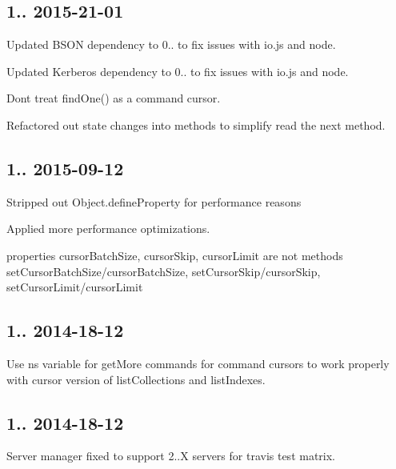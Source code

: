 \subsection*{1.. 2015-\/21-\/01 }


\begin{DoxyItemize}
\item Updated B\+S\+ON dependency to 0.. to fix issues with io.\+js and node.
\item Updated Kerberos dependency to 0.. to fix issues with io.\+js and node.
\item Don\textquotesingle{}t treat find\+One() as a command cursor.
\item Refactored out state changes into methods to simplify read the next method.
\end{DoxyItemize}

\subsection*{1.. 2015-\/09-\/12 }


\begin{DoxyItemize}
\item Stripped out Object.\+define\+Property for performance reasons
\item Applied more performance optimizations.
\item properties cursor\+Batch\+Size, cursor\+Skip, cursor\+Limit are not methods set\+Cursor\+Batch\+Size/cursor\+Batch\+Size, set\+Cursor\+Skip/cursor\+Skip, set\+Cursor\+Limit/cursor\+Limit
\end{DoxyItemize}

\subsection*{1.. 2014-\/18-\/12 }


\begin{DoxyItemize}
\item Use ns variable for get\+More commands for command cursors to work properly with cursor version of list\+Collections and list\+Indexes.
\end{DoxyItemize}

\subsection*{1.. 2014-\/18-\/12 }


\begin{DoxyItemize}
\item Server manager fixed to support 2..\+X servers for travis test matrix.
\end{DoxyItemize}


